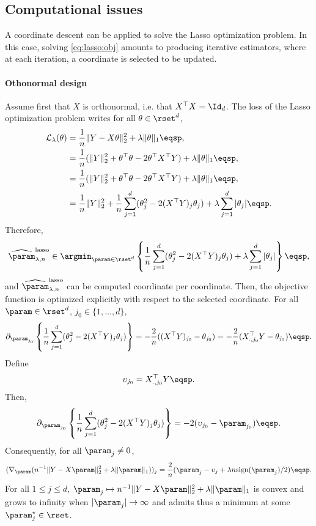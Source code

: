 \subsection{Computational issues}
A coordinate descent can be applied to solve the Lasso optimization problem. In this case, solving \eqref{eq:lasso:obj} amounts to producing iterative estimators, where at each iteration, a coordinate is selected to be updated.  

\paragraph{{\bf Othonormal design} } Assume first that $X$ is orthonormal, i.e. that $X^\top X = \Id_d$. The loss of the Lasso optimization problem writes for all $\theta\in\rset^d$,
\begin{align*}
\mathcal{L}_\lambda(\theta) &= \frac{1}{n}\|Y-X\theta\|_2^2 + \lambda \|\theta\|_1\eqsp,\\
&= \frac{1}{n}(\|Y\|_2^2+ \theta^\top \theta -2 \theta^\top X^\top Y) + \lambda \|\theta\|_1\eqsp,\\
&= \frac{1}{n}(\|Y\|_2^2+ \theta^\top \theta -2 \theta^\top X^\top Y) + \lambda \|\theta\|_1\eqsp,\\
&= \frac{1}{n}\|Y\|_2^2 + \frac{1}{n}\sum_{j=1}^{d}(\theta_j^2 -2 (X^\top Y)_j\theta_j) + \lambda \sum_{j=1}^d|\theta_j|\eqsp.
\end{align*}
Therefore,
$$
\widehat \param^{\mathrm{lasso}}_{\lambda,n}\in  \argmin_{\param\in\rset^d}  \left\{\frac{1}{n}\sum_{j=1}^{d}(\theta_j^2 -2 (X^\top Y)_j\theta_j) + \lambda \sum_{j=1}^d|\theta_j|\right\}\eqsp,
$$
and $\widehat \param^{\mathrm{lasso}}_{\lambda,n}$ can be computed coordinate per coordinate. Then, the objective function  is optimized explicitly  with respect to the selected coordinate. For all $\param \in \rset^d$,  $j_0\in\{1,\ldots,d\}$,
\[
\partial_{\param_{j_0}} \left\{\frac{1}{n}\sum_{j=1}^{d}(\theta_j^2 -2 (X^\top Y)_j\theta_j)\right\} = - \frac{2}{n}((X^\top Y)_{j_0} - \theta_{j_0}) = - \frac{2}{n}(X_{.,j_0}^\top Y - \theta_{j_0})\eqsp.
\]
Define
\[
\upsilon_{j_0}=X_{.,j_0}^\top Y\eqsp.
\]
Then,
\[
\partial_{\param_{j_0}} \left\{\frac{1}{n}\sum_{j=1}^{d}(\theta_j^2 -2 (X^\top Y)_j\theta_j)\right\} = -2( \upsilon_{j_0} - \param_{j_0})\eqsp.
\]
Consequently, for all $\param_j \neq 0$, 
\[
(\nabla_\param ( n^{-1}\|Y - X\param\|_2^2 +  \lambda\|\param\|_1))_j= \frac{2}{n}( \param_j - \upsilon_j + \lambda n\textrm{sign}(\param_j)/2)\eqsp.
\]
For all $1\leqslant j\leqslant d$,  $\param_j \mapsto  n^{-1}\|Y - X\param\|_2^2 + \lambda\|\param\|_1$ is convex and grows to infinity when $|\param_j|\to \infty$ and admits thus a minimum at some $\param_j^{\star}\in\rset$. 
